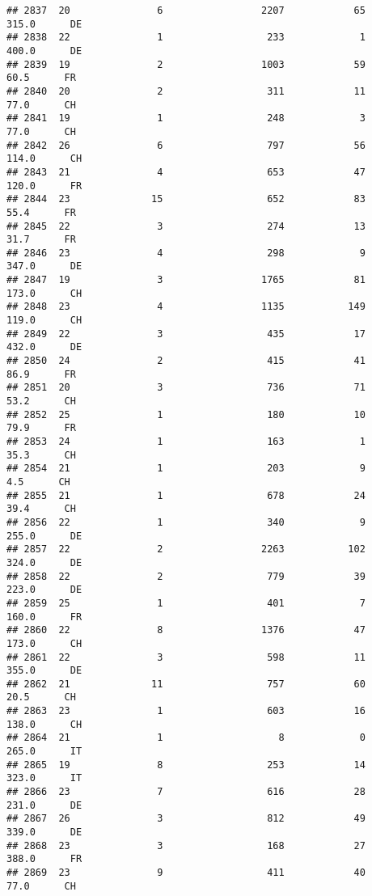 \documentclass[
]{article}
\begin{document}
\begin{verbatim}
## 2837  20               6                 2207            65    315.0      DE
## 2838  22               1                  233             1    400.0      DE
## 2839  19               2                 1003            59     60.5      FR
## 2840  20               2                  311            11     77.0      CH
## 2841  19               1                  248             3     77.0      CH
## 2842  26               6                  797            56    114.0      CH
## 2843  21               4                  653            47    120.0      FR
## 2844  23              15                  652            83     55.4      FR
## 2845  22               3                  274            13     31.7      FR
## 2846  23               4                  298             9    347.0      DE
## 2847  19               3                 1765            81    173.0      CH
## 2848  23               4                 1135           149    119.0      CH
## 2849  22               3                  435            17    432.0      DE
## 2850  24               2                  415            41     86.9      FR
## 2851  20               3                  736            71     53.2      CH
## 2852  25               1                  180            10     79.9      FR
## 2853  24               1                  163             1     35.3      CH
## 2854  21               1                  203             9      4.5      CH
## 2855  21               1                  678            24     39.4      CH
## 2856  22               1                  340             9    255.0      DE
## 2857  22               2                 2263           102    324.0      DE
## 2858  22               2                  779            39    223.0      DE
## 2859  25               1                  401             7    160.0      FR
## 2860  22               8                 1376            47    173.0      CH
## 2861  22               3                  598            11    355.0      DE
## 2862  21              11                  757            60     20.5      CH
## 2863  23               1                  603            16    138.0      CH
## 2864  21               1                    8             0    265.0      IT
## 2865  19               8                  253            14    323.0      IT
## 2866  23               7                  616            28    231.0      DE
## 2867  26               3                  812            49    339.0      DE
## 2868  23               3                  168            27    388.0      FR
## 2869  23               9                  411            40     77.0      CH

\end{verbatim}
\end{document}
